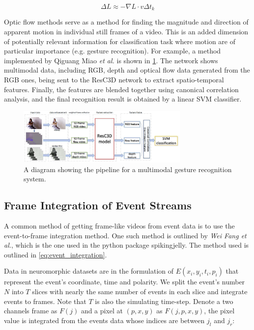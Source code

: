 \begin{equation}
      \Delta L \approx -\nabla L \cdot v \Delta t_k
      \label{eq:optic_flow}
\end{equation}

Optic flow methods serve as a method for finding the magnitude and direction of apparent motion in individual still frames of a video. This is an added dimension of potentially relevant information for classification task where motion are of particular importance (e.g. gesture recognition). For example, a method implemented by Qiguang Miao \textit{et al.}\cite{MultimodalGestureRecognition} is shown in \cref{fig:multimodal_gesture_recognition_pipeline}. The network shows multimodal data, including RGB, depth and optical flow data generated from the RGB ones, being sent to the ResC3D network to extract spatio-temporal features. Finally, the features are blended together using canonical correlation analysis, and the final recognition result is obtained by a linear SVM classifier.

\begin{figure}[htb]
      \centering
      \includegraphics[width=0.75\textwidth]{background/images/multimodal_gesture_recognition_pipeline.png}
      \caption{A diagram showing the pipeline for a multimodal gesture recognition system\cite{MultimodalGestureRecognition}.}
      \label{fig:multimodal_gesture_recognition_pipeline}
\end{figure}

\subsection{Frame Integration of Event Streams} \label{ssec:frame_integration}

A common method of getting frame-like videos from event data is to use the event-to-frame integration method. One such method is outlined by \textit{Wei Fang et al.}\cite{LearnableMembraneSNN}, which is the one used in the python package spikingjelly\cite{SpikingJelly}. The method used is outlined in \cref{eq:event_integration}.

Data in neuromorphic datasets are in the formulation of $ E(x_i, y_i, t_i, p_i) $ that represent the event's coordinate, time and polarity. We split the event's number $ N $ into $ T $ slices with nearly the same number of events in each slice and integrate events to frames. Note that $ T $ is also the simulating time-step. Denote a two channels frame as $ F(j) $ and a pixel at $ (p, x, y) $ as $ F(j, p, x, y) $, the pixel value is integrated from the events data whose indices are between $ j_l $ and $ j_r $:

